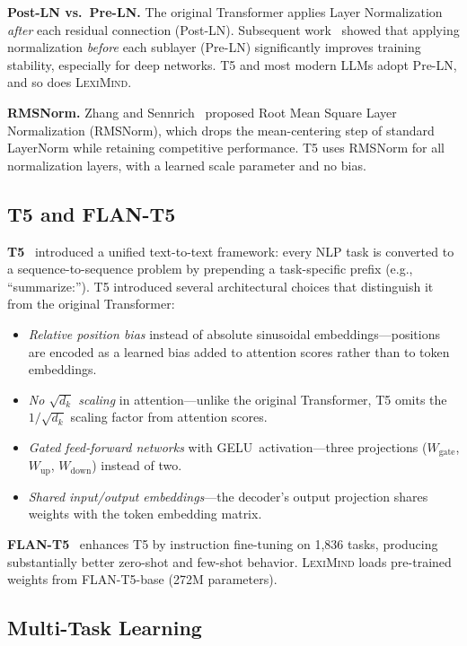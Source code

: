 \documentclass[11pt,a4paper]{article}
\newcommand{\lexiname}{\textsc{LexiMind}}
\newcommand{\tflant}{FLAN-T5}
\begin{document}
\textbf{Post-LN vs.\ Pre-LN.}
The original Transformer applies Layer Normalization~\citep{ba2016layer} \emph{after} each residual connection (Post-LN).
Subsequent work~\citep{xiong2020layer} showed that applying normalization \emph{before} each sublayer (Pre-LN) significantly improves training stability, especially for deep networks.
T5 and most modern LLMs adopt Pre-LN, and so does \lexiname{}.

\textbf{RMSNorm.}
Zhang and Sennrich~\citep{zhang2019root} proposed Root Mean Square Layer Normalization (RMSNorm), which drops the mean-centering step of standard LayerNorm while retaining competitive performance.
T5 uses RMSNorm for all normalization layers, with a learned scale parameter and no bias.

\subsection{T5 and FLAN-T5}

\textbf{T5}~\citep{raffel2020exploring} introduced a unified text-to-text framework: every NLP task is converted to a sequence-to-sequence problem by prepending a task-specific prefix (e.g., ``summarize:'').
T5 introduced several architectural choices that distinguish it from the original Transformer:
\begin{itemize}[nosep]
    \item \emph{Relative position bias} instead of absolute sinusoidal embeddings---positions are encoded as a learned bias added to attention scores rather than to token embeddings.
    \item \emph{No $\sqrt{d_k}$ scaling} in attention---unlike the original Transformer, T5 omits the $1/\sqrt{d_k}$ scaling factor from attention scores.
    \item \emph{Gated feed-forward networks} with GELU~activation---three projections ($W_\text{gate}$, $W_\text{up}$, $W_\text{down}$) instead of two.
    \item \emph{Shared input/output embeddings}---the decoder's output projection shares weights with the token embedding matrix.
\end{itemize}

\textbf{\tflant{}}~\citep{chung2022scaling} enhances T5 by instruction fine-tuning on 1,836 tasks, producing substantially better zero-shot and few-shot behavior.
\lexiname{} loads pre-trained weights from \tflant{}-base (272M parameters).

\subsection{Multi-Task Learning}
\end{document}
